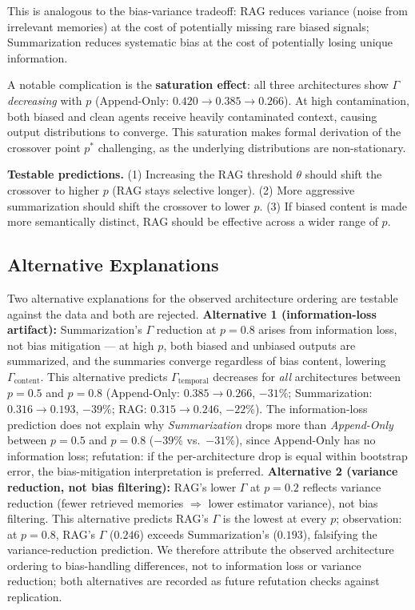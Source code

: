 \documentclass[11pt]{article}
\begin{document}
This is analogous to the bias-variance tradeoff: RAG reduces variance (noise from irrelevant memories) at the cost of potentially missing rare biased signals; Summarization reduces systematic bias at the cost of potentially losing unique information.

A notable complication is the \textbf{saturation effect}: all three architectures show $\Gamma$ \emph{decreasing} with $p$ (Append-Only: $0.420 \to 0.385 \to 0.266$). At high contamination, both biased and clean agents receive heavily contaminated context, causing output distributions to converge. This saturation makes formal derivation of the crossover point $p^*$ challenging, as the underlying distributions are non-stationary.

\textbf{Testable predictions.} (1) Increasing the RAG threshold $\theta$ should shift the crossover to higher $p$ (RAG stays selective longer). (2) More aggressive summarization should shift the crossover to lower $p$. (3) If biased content is made more semantically distinct, RAG should be effective across a wider range of $p$.

\subsection{Alternative Explanations}

Two alternative explanations for the observed architecture ordering are testable against the data and both are rejected. \textbf{Alternative 1 (information-loss artifact):} Summarization's $\Gamma$ reduction at $p=0.8$ arises from information loss, not bias mitigation --- at high $p$, both biased and unbiased outputs are summarized, and the summaries converge regardless of bias content, lowering $\Gamma_{\text{content}}$. This alternative predicts $\Gamma_{\text{temporal}}$ decreases for \emph{all} architectures between $p=0.5$ and $p=0.8$ (Append-Only: $0.385 \to 0.266$, $-31\%$; Summarization: $0.316 \to 0.193$, $-39\%$; RAG: $0.315 \to 0.246$, $-22\%$). The information-loss prediction does not explain why \emph{Summarization} drops more than \emph{Append-Only} between $p=0.5$ and $p=0.8$ ($-39\%$ vs.\ $-31\%$), since Append-Only has no information loss; refutation: if the per-architecture drop is equal within bootstrap error, the bias-mitigation interpretation is preferred. \textbf{Alternative 2 (variance reduction, not bias filtering):} RAG's lower $\Gamma$ at $p=0.2$ reflects variance reduction (fewer retrieved memories $\Rightarrow$ lower estimator variance), not bias filtering. This alternative predicts RAG's $\Gamma$ is the lowest at every $p$; observation: at $p=0.8$, RAG's $\Gamma$ ($0.246$) exceeds Summarization's ($0.193$), falsifying the variance-reduction prediction. We therefore attribute the observed architecture ordering to bias-handling differences, not to information loss or variance reduction; both alternatives are recorded as future refutation checks against replication.
\end{document}
